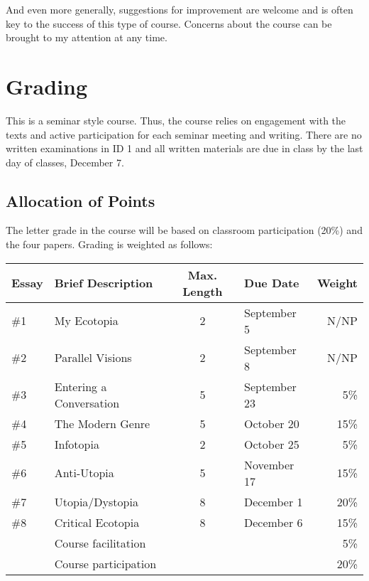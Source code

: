 And even more generally, suggestions for improvement are welcome and is often key to the success of this type of course. Concerns about the course can be brought to my attention at any time. 

\section{Grading} 

This is a seminar style course. Thus, the course relies on engagement with the texts and active participation for each seminar meeting and writing. There are no written examinations in ID 1 and all written materials are due in class by the last day of classes, December 7. 

\subsection{Allocation of Points} 

The letter grade in the course will be based on classroom participation (20\%) and the four papers. Grading is weighted as follows:

\begin{table}
\begin{tabular}{llclr}\hline
Essay	& Brief Description	            & Max. Length	& Due Date	 & Weight \\\hline\hline
\#1	  & My Ecotopia	                  & 2	          & September 5	& N/NP \\
\#2	  & Parallel Visions              & 2           & September 8 & N/NP \\
\#3   & Entering a Conversation       & 5	          & September 23 & 	5\% \\
\#4   & The Modern Genre              & 5           & October 20  & 15\% \\
\#5   & Infotopia                     &	2	          & October 25	& 5\% \\
\#6	  & Anti-Utopia	                  & 5           &	November 17	 & 15\% \\
\#7	  & Utopia/Dystopia	              & 8           &	December 1	 & 20\% \\
\#8	  & Critical Ecotopia             & 8           &	December 6  & 15\% \\
    & Course facilitation	            &             &             &	5\% \\
    & Course participation	          &             &             & 20\% \\ \hline
\hline
\end{tabular}
\end{table}


